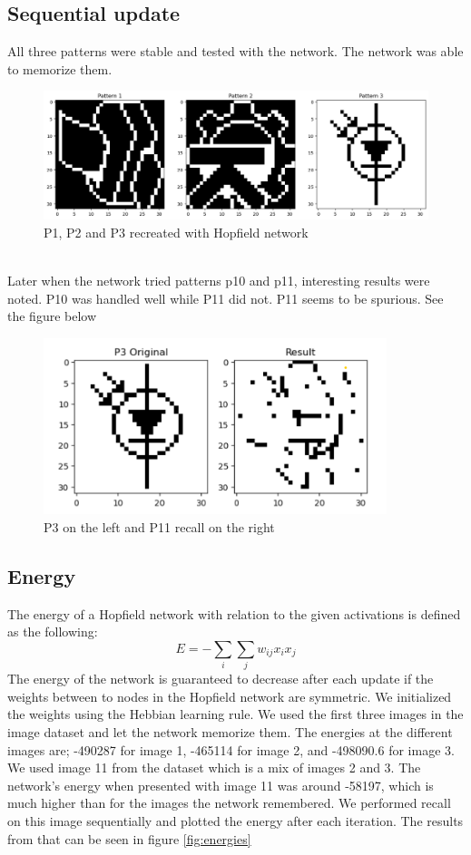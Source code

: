 \documentclass[a4paper]{article}
\begin{document}
\subsection{Sequential update}
All three patterns were stable and tested with the network. The network was able to memorize them. \\
\begin{figure}[htb]
    \centering
    \includegraphics[width=\textwidth]{Labs/Lab 3/Rakin/Results/3.2-3Patterns.png}
    \caption{P1, P2 and P3 recreated with Hopfield network }
    \label{fig:enter-label}
\end{figure}
\\Later when the network tried patterns p10 and p11, interesting results were noted. P10 was handled well while P11 did not. P11 seems to be spurious. See the figure below\\

\begin{figure}[htb]
    \centering
    \includegraphics[width=10cm]{Labs/Lab 3/Rakin/Results/3.2-p11.png}
    \caption{P3 on the left and P11 recall on the right}
    \label{fig:enter-label}
\end{figure}

\subsection{Energy}
The energy of a Hopfield network  with relation to the given activations is defined as the following:
$$
E = -\sum_i\sum_j w_{ij}x_ix_j
$$
The energy of the network is guaranteed to decrease after each update if the weights between to nodes in the Hopfield network are symmetric. We initialized the weights using the Hebbian learning rule. We used the first three images in the image dataset and let the network memorize them. The energies at the different images are; -490287 for image 1, -465114 for image 2, and -498090.6 for image 3. We used image 11 from the dataset which is a mix of images 2 and 3. The network's energy when presented with image 11 was around -58197, which is much higher than for the images the network remembered. We performed recall on this image sequentially and plotted the energy after each iteration. The results from that can be seen in figure \ref{fig:energies}
\end{document}
